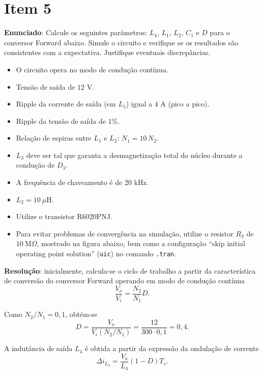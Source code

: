 \section*{Item 5}\label{it:5}

\textbf{Enunciado}: Calcule os seguintes parâmetros: $L_4$, $L_1$, $L_2$, $C_1$ e $D$ para o conversor Forward abaixo. Simule o circuito e verifique se os resultados são consistentes com a expectativa. Justifique eventuais discrepâncias.

\begin{itemize}
	\item O circuito opera no modo de condução contínua.
	\item Tensão de saída de $12$ V.
	\item Ripple da corrente de saída (em $L_5$) igual a $4$ A (pico a pico).
	\item Ripple da tensão de saída de $1\%$.
	\item Relação de espiras entre $L_1$ e $L_2$: $N_1 = 10\,N_2$.
	\item $L_3$ deve ser tal que garanta a desmagnetização total do núcleo durante a condução de $D_3$.
	\item A frequência de chaveamento é de $20$ kHz.
	\item $L_2 = 10~\mu\text{H}$.
	\item Utilize o transistor R6020PNJ.
	\item Para evitar problemas de convergência na simulação, utilize o resistor $R_3$ de $10~\text{M}\Omega$, mostrado na figura abaixo, bem como a configuração ``skip initial operating point solution'' (\texttt{uic}) no comando \texttt{.tran}.
\end{itemize}

\textbf{Resolução}: inicialmente, calcula-se o ciclo de trabalho a partir da característica de conversão do conversor Forward operando em modo de condução contínua~\cite{forward_notas}
\begin{equation*}
	\frac{V_o}{V_i}
	=
	\frac{N_2}{N_1}D.
\end{equation*}

Como $N_2/N_1=0{,}1$, obtém-se
\begin{equation*}
	D
	=
	\frac{V_o}{V_i(N_2/N_1)}
	=
	\frac{12}{300\cdot0{,}1}
	=
	0{,}4.
\end{equation*}

A indutância de saída $L_4$ é obtida a partir da expressão da ondulação de corrente
\begin{equation*}
	\Delta i_{L_4}
	=
	\frac{V_o}{L_4}(1-D)T_s.
\end{equation*}

